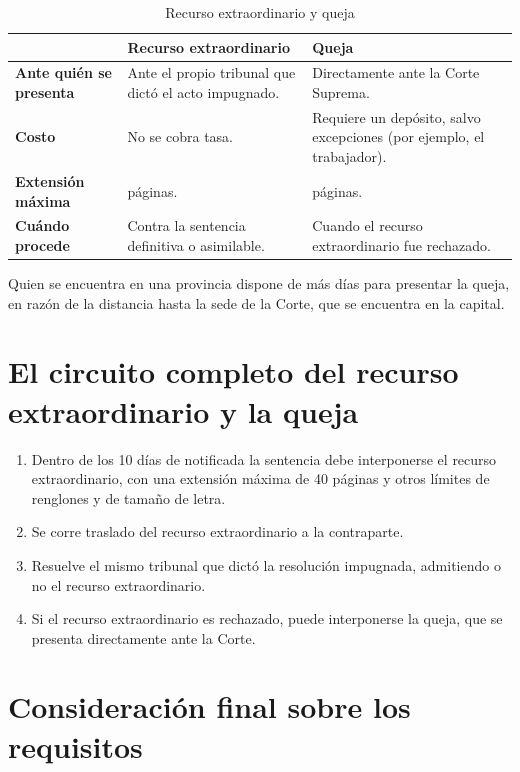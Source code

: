 \documentclass[12pt,oneside]{book}
\begin{document}
\begin{table}[H]
\centering
\begin{tabularx}{\textwidth}{@{}>{\raggedright\arraybackslash}p{}>{\raggedright\arraybackslash}X>{\raggedright\arraybackslash}X@{}}
\toprule
 & \textbf{Recurso extraordinario} & \textbf{Queja} \\
\midrule
\textbf{Ante quién se presenta} &
Ante el propio tribunal que dictó el acto impugnado. &
Directamente ante la Corte Suprema. \\
\addlinespace[0.4em]
\textbf{Costo} &
No se cobra tasa. &
Requiere un depósito, salvo excepciones (por ejemplo, el trabajador). \\
\addlinespace[0.4em]
\textbf{Extensión máxima} &
40 páginas. &
10 páginas. \\
\addlinespace[0.4em]
\textbf{Cuándo procede} &
Contra la sentencia definitiva o asimilable. &
Cuando el recurso extraordinario fue rechazado. \\
\bottomrule
\end{tabularx}
\caption{Recurso extraordinario y queja}
\end{table}

Quien se encuentra en una provincia dispone de más días para presentar la queja, en razón de la distancia hasta la sede de la Corte, que se encuentra en la capital.

\section{El circuito completo del recurso extraordinario y la queja}

\begin{enumerate}
    \item Dentro de los 10 días de notificada la sentencia debe interponerse el recurso extraordinario, con una extensión máxima de 40 páginas y otros límites de renglones y de tamaño de letra.
    \item Se corre traslado del recurso extraordinario a la contraparte.
    \item Resuelve el mismo tribunal que dictó la resolución impugnada, admitiendo o no el recurso extraordinario.
    \item Si el recurso extraordinario es rechazado, puede interponerse la queja, que se presenta directamente ante la Corte.
\end{enumerate}

\section{Consideración final sobre los requisitos}
\end{document}
